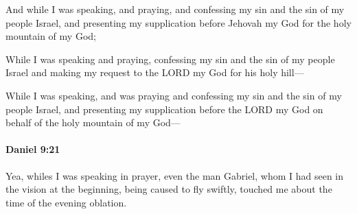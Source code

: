 			\begin{versebox}
					\item[BHS] 
					\item[LXX] 
					\item[ASV] And while I was speaking, and praying, and confessing my sin and the sin of my people Israel, and presenting my supplication before Jehovah my God for the holy mountain of my God;
					\item[NIV] While I was speaking and praying, confessing my sin and the sin of my people Israel and making my request to the LORD my God for his holy hill—
					\item[NRSV] While I was speaking, and was praying and confessing my sin and the sin of my people Israel, and presenting my supplication before the LORD my God on behalf of the holy mountain of my God—
			\end{versebox}

		\paragraph{Daniel 9:21} %
			\label{DANIEL-9-21}

			Yea, whiles I was speaking in prayer, even the man Gabriel, whom I had seen in the vision at the beginning, being caused to fly swiftly, touched me about the time of the evening oblation.

